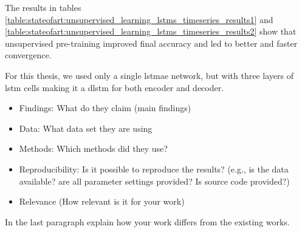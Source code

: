 The results in tables \ref{table:stateofart:unsupervised_learning_lstms_timeseries_results1} and \ref{table:stateofart:unsupervised_learning_lstms_timeseries_results2} show that unsupervised pre-training improved final accuracy and led to better and faster convergence. \par

For this thesis, we used only a single \gls{lstmae} network, but with three layers of \gls{lstm} cells making it a \gls{dlstm} for both encoder and decoder.

\begin{itemize}
	\item Findings: What do they claim (main findings)
	\item Data: What data set they are using
	\item Methods: Which methods did they use?
	\item Reproducibility: Is it possible to reproduce the results? (e.g., is the data available? are all parameter settings provided? Is source code provided?)
	\item Relevance (How relevant is it for your work)
\end{itemize}


In the last paragraph explain how your work differs from the existing works.



\newpage
